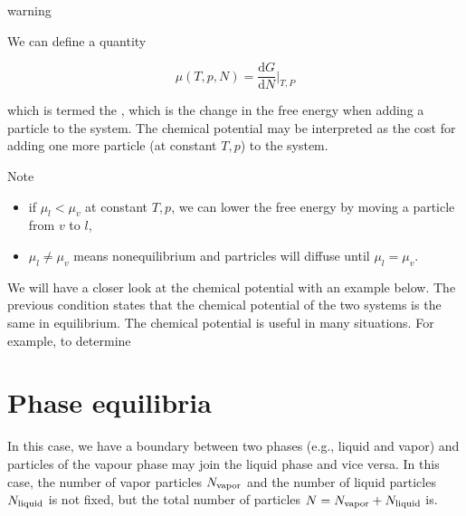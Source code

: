 \documentclass[letterpaper,10pt,english]{sphinxmanual}
\let\sphinxpxdimen\pdfpxdimen\else\newdimen\sphinxpxdimen
\begin{document}
\begin{sphinxadmonition}{warning}{}\unskip
\sphinxAtStartPar
{}

\sphinxAtStartPar
We can define a quantity

\sphinxAtStartPar
\begin{equation}
\mu(T,p,N)=\frac{\mathrm dG}{\mathrm dN}\bigg|_{T,P}
\end{equation}

\sphinxAtStartPar
which is termed the , which is the change in the free energy when adding a particle to the system. The chemical potential may be interpreted as the cost for adding one more particle (at constant \(T,p\)) to the system.

\sphinxAtStartPar
Note
\begin{itemize}
\item {} 
\sphinxAtStartPar
if \(\mu_l<\mu_v\) at constant \(T,p\), we can lower the free energy by moving a particle from \(v\) to \(l\),

\item {} 
\sphinxAtStartPar
\(\mu_l\neq \mu_v\) means non\sphinxhyphen{}equilibrium and partricles will diffuse until \(\mu_l=\mu_v\).

\end{itemize}
\end{sphinxadmonition}

\sphinxAtStartPar
We will have a closer look at the chemical potential with an example below. The previous condition states that the chemical potential of the two systems is the same in equilibrium. The chemical potential is useful in many situations. For example, to determine


\section{Phase equilibria}
\label{\detokenize{notebooks/L3/2_Chemical_Potential:Phase-equilibria}}
\noindent\sphinxincludegraphics[width=318\sphinxpxdimen,height=323\sphinxpxdimen]{{phase_equilibria}.png}

\sphinxAtStartPar
In this case, we have a boundary between two phases (e.g., liquid and vapor) and particles of the vapour phase may join the liquid phase and vice versa. In this case, the number of vapor particles \(N_{\rm vapor}\) and the number of liquid particles \(N_{\rm liquid}\) is not fixed, but the total number of particles \(N=N_{\rm vapor}+N_{\rm liquid}\) is.
\end{document}
